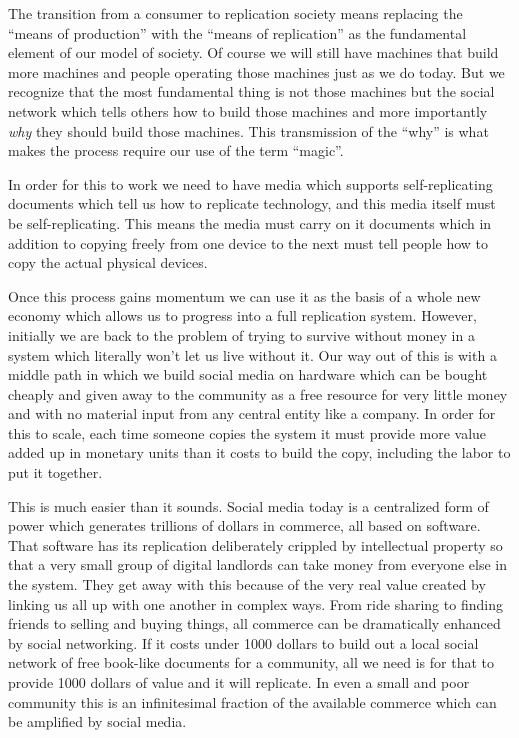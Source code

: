 The transition from a consumer to replication society means replacing
the ``means of production'' with the ``means of replication'' as the
fundamental element of our model of society. Of course we will still
have machines that build more machines and people operating those
machines just as we do today. But we recognize that the most fundamental
thing is not those machines but the social network which tells others
how to build those machines and more importantly \emph{why} they should
build those machines. This transmission of the ``why'' is what makes the
process require our use of the term ``magic''.

In order for this to work we need to have media which supports
self-replicating documents which tell us how to replicate technology,
and this media itself must be self-replicating. This means the media
must carry on it documents which in addition to copying freely from one
device to the next must tell people how to copy the actual physical
devices.

Once this process gains momentum we can use it as the basis of a whole
new economy which allows us to progress into a full replication system.
However, initially we are back to the problem of trying to survive
without money in a system which literally won't let us live without it.
Our way out of this is with a middle path in which we build social media
on hardware which can be bought cheaply and given away to the community
as a free resource for very little money and with no material input from
any central entity like a company. In order for this to scale, each time
someone copies the system it must provide more value added up in
monetary units than it costs to build the copy, including the labor to
put it together.

This is much easier than it sounds. Social media today is a centralized
form of power which generates trillions of dollars in commerce, all
based on software. That software has its replication deliberately
crippled by intellectual property so that a very small group of digital
landlords can take money from everyone else in the system. They get away
with this because of the very real value created by linking us all up
with one another in complex ways. From ride sharing to finding friends
to selling and buying things, all commerce can be dramatically enhanced
by social networking. If it costs under 1000 dollars to build out a
local social network of free book-like documents for a community, all we
need is for that to provide 1000 dollars of value and it will replicate.
In even a small and poor community this is an infinitesimal fraction of
the available commerce which can be amplified by social media.

